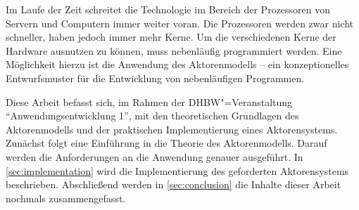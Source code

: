 Im Laufe der Zeit schreitet die Technologie im Bereich der Prozessoren von Servern und Computern immer weiter voran.
Die Prozessoren werden zwar nicht schneller, haben jedoch immer mehr Kerne.
Um die verschiedenen Kerne der Hardware ausnutzen zu können, muss nebenläufig programmiert werden.
Eine Möglichkeit hierzu ist die Anwendung des Aktorenmodells -- ein konzeptionelles Entwurfsmuster für die Entwicklung von nebenläufigen Programmen.

Diese Arbeit befasst sich, im Rahmen der DHBW"=Veranstaltung \enquote{Anwendungsentwicklung 1}, mit den theoretischen Grundlagen des Aktorenmodells und der praktischen Implementierung eines Aktorensystems.
Zunächst folgt eine Einführung in die Theorie des Aktorenmodells.
Darauf werden die Anforderungen an die Anwendung genauer ausgeführt.
In \autoref{sec:implementation} wird die Implementierung des geforderten Aktorensystems beschrieben.
Abschließend werden in \autoref{sec:conclusion} die Inhalte dieser Arbeit nochmals zusammengefasst.
